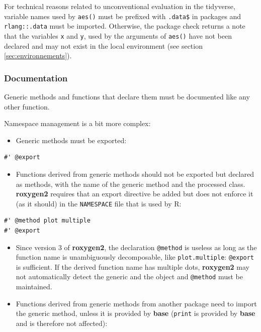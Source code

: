 \documentclass[
  12pt,
  american,
  a4paper,
  extrafontsizes,onecolumn,openright
  ]{memoir}
\providecommand{\tightlist}{%
  \setlength{\itemsep}{0pt}\setlength{\parskip}{0pt}}
\begin{document}
\normalsize

For technical reasons related to unconventional evaluation in the tidyverse, variable names used by \texttt{aes()} must be prefixed with \texttt{.data\$} in packages and \texttt{rlang::.data} must be imported.
Otherwise, the package check returns a note that the variables \texttt{x} and \texttt{y}, used by the arguments of \texttt{aes()} have not been declared and may not exist in the local environment (see section \ref{sec:environnements}).

\hypertarget{documentation}{%
\subsubsection{Documentation}\label{documentation}}

Generic methods and functions that declare them must be documented like any other function.

Namespace management is a bit more complex:

\begin{itemize}
\tightlist
\item
  Generic methods must be exported:
\end{itemize}

\begin{verbatim}
#' @export
\end{verbatim}

\begin{itemize}
\tightlist
\item
  Functions derived from generic methods should not be exported but declared as methods, with the name of the generic method and the processed class.
  \textbf{roxygen2} requires that an export directive be added but does not enforce it (as it should) in the \texttt{NAMESPACE} file that is used by R:
\end{itemize}

\begin{verbatim}
#' @method plot multiple
#' @export
\end{verbatim}

\begin{itemize}
\item
  Since version 3 of \textbf{roxygen2}, the declaration \texttt{@method} is useless as long as the function name is unambiguously decomposable, like \texttt{plot.multiple}: \texttt{@export} is sufficient.
  If the derived function name has multiple dots, \textbf{roxygen2} may not automatically detect the generic and the object and \texttt{@method} must be maintained.
\item
  Functions derived from generic methods from another package need to import the generic method, unless it is provided by \textbf{base} (\texttt{print} is provided by \textbf{base} and is therefore not affected):
\end{itemize}
\end{document}
